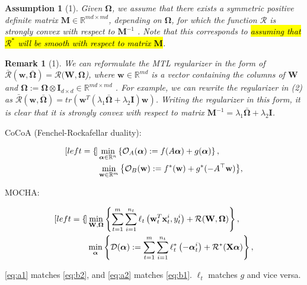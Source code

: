 \documentclass[UTF8,aspectratio=169,presentation]{ctexbeamer}
\makeatletter
\let\HL\hl
\renewcommand\hl{%
  \let\set@color\beamerorig@set@color
  \let\reset@color\beamerorig@reset@color
  \HL}
\newtheorem{assumption}{Assumption}
\newtheorem{remark}{Remark}
\makeatother
\begin{document}
\begin{frame}[t]
\begin{assumption}[1]
  Given $\boldsymbol\Omega$, we assume that there exists a symmetric positive definite matrix $\mathbf M \in \mathbb R^{md×md}$, depending on $\boldsymbol\Omega$, for which the function $\mathcal R$ is strongly convex with respect to $\mathbf M^{−1}$ . Note
  that this corresponds to \hl{assuming that $\mathcal R^{*}$ will be smooth with respect to matrix $\mathbf M$}.
  
\end{assumption}

\begin{remark}[1]
  We can reformulate the MTL regularizer in the form of $\bar{\mathcal R}(\mathbf w, \bar{\boldsymbol\Omega}) = \mathcal R( \mathbf W, \boldsymbol\Omega$), where
  $\mathbf w \in \mathbb R^{md}$ is a vector containing the columns of $\mathbf W$ and $\boldsymbol \Omega  := \boldsymbol\Omega \otimes \mathbf I_{d×d} \in \mathbb R^{md\times md}$
  . For example, we can rewrite the regularizer in (2) as $\bar{\mathcal R}( \mathbf w,\bar{\boldsymbol \Omega} ) = tr(\mathbf w^T (\lambda_1 \bar{\boldsymbol\Omega}+ \lambda_2 \mathbf I) \mathbf w)$. Writing the regularizer
  in this form, it is clear that it is strongly convex with respect to matrix $\mathbf M^{−1} = \lambda_1 \bar{\boldsymbol\Omega}+ \lambda_2 \mathbf I$.
\end{remark}
\end{frame}


\begin{frame}[c]


CoCoA (Fenchel-Rockafellar
duality):

\begin{subequations}
  \begin{align}[left=\empheqlbrace]
      & \min _{\boldsymbol{\alpha} \in \mathbb{R}^{n}}  \left\{ {\mathcal{O}_{A}(\boldsymbol{\alpha}) :=f(A \boldsymbol{\alpha})+g(\boldsymbol{\alpha})} \right\} , \label{eq:a1} \\
      & \min _{\mathbf{w} \in \mathbb{R}^{m}} {\left\{\mathcal{O}_{B}(\mathbf{w}) :=f^{*}(\mathbf{w})+g^{*}(-A^{\top} \mathbf{w})\right\}},  \label{eq:a2}
    \end{align}
\end{subequations}

MOCHA:

\begin{subequations}
  \begin{align}[left=\empheqlbrace]
      & \eqone, \label{eq:b1} \\
      & \eqtwo, \label{eq:b2} 
    \end{align}
\end{subequations}

\ref{eq:a1} matches \ref{eq:b2}, and \ref{eq:a2} matches \ref{eq:b1}. $\ell_t$ matches $g$ and vice versa.

\end{frame}
\end{document}
